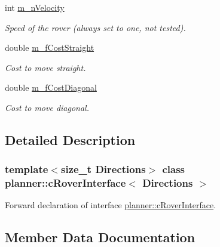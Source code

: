 \begin{DoxyCompactItemize}
int \mbox{\hyperlink{classplanner_1_1c_rover_interface_a458f3e469a13cfc909e957678ddee753}{m\+\_\+n\+Velocity}}
\begin{DoxyCompactList}\small\item\em Speed of the rover (always set to one, not tested). \end{DoxyCompactList}\item 
\mbox{\label{classplanner_1_1c_rover_interface_ad94337c2b05eed20423c1a2dcaa680cc}} 
double \mbox{\hyperlink{classplanner_1_1c_rover_interface_ad94337c2b05eed20423c1a2dcaa680cc}{m\+\_\+f\+Cost\+Straight}}
\begin{DoxyCompactList}\small\item\em Cost to move straight. \end{DoxyCompactList}\item 
\mbox{\label{classplanner_1_1c_rover_interface_afcc4b7ec327b8d2ddcdb163c7a8397b3}} 
double \mbox{\hyperlink{classplanner_1_1c_rover_interface_afcc4b7ec327b8d2ddcdb163c7a8397b3}{m\+\_\+f\+Cost\+Diagonal}}
\begin{DoxyCompactList}\small\item\em Cost to move diagonal. \end{DoxyCompactList}\end{DoxyCompactItemize}


\subsection{Detailed Description}
\subsubsection*{template$<$size\+\_\+t Directions$>$\newline
class planner\+::c\+Rover\+Interface$<$ Directions $>$}

Forward declaration of interface \mbox{\hyperlink{classplanner_1_1c_rover_interface}{planner\+::c\+Rover\+Interface}}. 

\subsection{Member Data Documentation}
\mbox{\label{classplanner_1_1c_rover_interface_af2922d392a98ab42a3f8e706851a4813}} 
